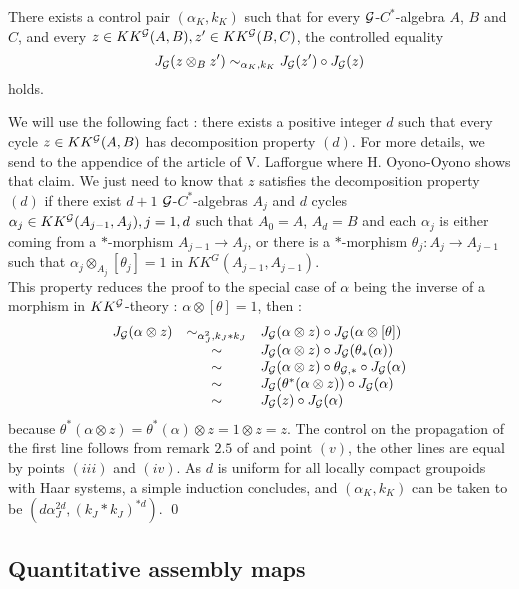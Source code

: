 \begin{prop} There exists a control pair $(\alpha_K,k_K)$ such that for every $\mathcal G$-$C^*$-algebra $A$, $B$ and $C$, and every $z\in KK^\mathcal G(A,B),z'\in KK^\mathcal G(B,C)$, the controlled equality
\[J_\mathcal G(z\otimes_B z') \sim_{\alpha_K,k_K} J_\mathcal G(z')\circ J_\mathcal G(z)\]
holds.
\end{prop}
\begin{dem}
We will use the following fact : there exists a positive integer $d$ such that every cycle $z\in KK^\mathcal G(A,B)$ has decomposition property $(d)$. For more details, we send to the appendice of the article of V. Lafforgue \cite{LaffOY} where H. Oyono-Oyono shows that claim. We just need to know that $z$ satisfies the decomposition property $(d)$ if there exist $d+1$ $\mathcal G$-$C^*$-algebras $A_j$  and $d$ cycles $\alpha_j\in KK^\mathcal G(A_{j-1},A_j), j=1,d$ such that $A_0=A$, $A_d=B$ and each $\alpha_j$ is either coming from a $*$-morphism $A_{j-1}\rightarrow A_j$, or there is a $*$-morphism $\theta_j: A_j\rightarrow A_{j-1}$ such that $\alpha_j \otimes_{A_j} [\theta_j]=1$ in $KK^G(A_{j-1},A_{j-1})$.\\

This property reduces the proof to the special case of $\alpha$ being the inverse of a morphism in $KK^\mathcal G$-theory : $\alpha\otimes[\theta]=1$, then :
\[\begin{array}{rcl}
J_\mathcal G (\alpha\otimes z) & \sim_{\alpha_J^2,k_J*k_J} &  J_\mathcal G(\alpha\otimes z)\circ J_\mathcal G(\alpha\otimes [\theta]) \\
			& \sim & J_\mathcal G(\alpha\otimes z)\circ J_\mathcal G(\theta_*(\alpha))\\
			& \sim & J_\mathcal G(\alpha\otimes z)\circ \theta_{\mathcal G,*}\circ J_\mathcal G(\alpha)\\
			& \sim & J_\mathcal G(\theta^*(\alpha\otimes z))\circ J_\mathcal G(\alpha)\\
			& \sim & J_\mathcal G(z)\circ J_\mathcal G(\alpha) \\
\end{array}\] 
because $\theta^*(\alpha\otimes z)=\theta^*(\alpha)\otimes z=1\otimes z =z$. The control on the propagation of the first line follows from remark $2.5$ of \cite{OY2} and point $(v)$, the other lines are equal by points $(iii)$ and $(iv)$. As $d$ is uniform for all locally compact groupoids with Haar systems, a simple induction concludes, and $(\alpha_K,k_K)$ can be taken to be $(d \alpha_J^{2d},( k_J*k_J)^{*d})$.
\qed
\end{dem}

\subsection{Quantitative assembly maps}


